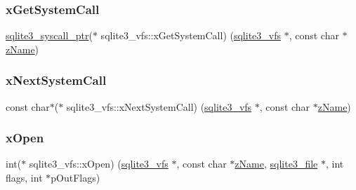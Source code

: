 \mbox{\label{structsqlite3__vfs_a1bf78a1603ab605cd92d146e3f810727}} 
\subsubsection{\texorpdfstring{xGetSystemCall}{xGetSystemCall}}
{\footnotesize\ttfamily \mbox{\hyperlink{sqlite3_8h_a99a6393e96d7095fa024de9c1257aa6f}{sqlite3\+\_\+syscall\+\_\+ptr}}($\ast$ sqlite3\+\_\+vfs\+::x\+Get\+System\+Call) (\mbox{\hyperlink{structsqlite3__vfs}{sqlite3\+\_\+vfs}} $\ast$, const char $\ast$\mbox{\hyperlink{structsqlite3__vfs_a0f06a27ac2201ea04c0623ef19e5d73e}{z\+Name}})}

\mbox{\label{structsqlite3__vfs_afbd158883d9bb7954fa7ecd595fe3c2b}} 
\subsubsection{\texorpdfstring{xNextSystemCall}{xNextSystemCall}}
{\footnotesize\ttfamily const char$\ast$($\ast$ sqlite3\+\_\+vfs\+::x\+Next\+System\+Call) (\mbox{\hyperlink{structsqlite3__vfs}{sqlite3\+\_\+vfs}} $\ast$, const char $\ast$\mbox{\hyperlink{structsqlite3__vfs_a0f06a27ac2201ea04c0623ef19e5d73e}{z\+Name}})}

\mbox{\label{structsqlite3__vfs_ab106b445eb5d372266a1108fc982a9aa}} 
\subsubsection{\texorpdfstring{xOpen}{xOpen}}
{\footnotesize\ttfamily int($\ast$ sqlite3\+\_\+vfs\+::x\+Open) (\mbox{\hyperlink{structsqlite3__vfs}{sqlite3\+\_\+vfs}} $\ast$, const char $\ast$\mbox{\hyperlink{structsqlite3__vfs_a0f06a27ac2201ea04c0623ef19e5d73e}{z\+Name}}, \mbox{\hyperlink{structsqlite3__file}{sqlite3\+\_\+file}} $\ast$, int flags, int $\ast$p\+Out\+Flags)}

\mbox{\label{structsqlite3__vfs_ac74c20a91cbd440ed72b11de4c4333ea}} 
